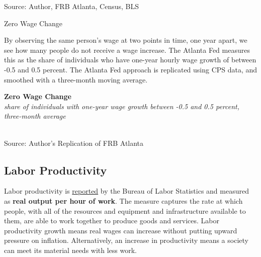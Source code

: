 \documentclass{report}
\makeatletter
\newcommand{\tbllink}[1]{\href{https://raw.githubusercontent.com/bdecon/US-chartbook/master/chartbook/data/#1}{\faTable}}
\newcommand*\short[1]{\expandafter\@gobbletwo\number\numexpr#1\relax}
\newcommand{\dateaxisticks}{
		date coordinates in=x, axis line style={draw=none},
		xmax={2023-11-30},
		max space between ticks=40,	    
		xtick={{1990-01-01}, {1992-01-01}, {1994-01-01}, 
			{1996-01-01}, {1998-01-01}, {2000-01-01}, 
			{2002-01-01}, {2004-01-01}, {2006-01-01},
			{2008-01-01}, {2010-01-01}, {2012-01-01}, {2014-01-01},
		    {2016-01-01}, {2018-01-01}, {2020-01-01}, {2022-01-01}, 
		    {2024-01-01}, {2026-01-01}},
		minor xtick={{1989-01-01}, {1991-01-01}, {1993-01-01},
			{1995-01-01}, {1997-01-01}, {1999-01-01}, 
			{2001-01-01}, {2003-01-01}, {2005-01-01}, {2007-01-01},
		    {2009-01-01}, {2011-01-01}, {2013-01-01}, {2015-01-01},
		    {2017-01-01}, {2019-01-01}, {2021-01-01}, {2023-01-01}, 
		    {2025-01-01}, {2027-01-01}},
		enlarge y limits={0.06}, enlarge x limits={0.01},
		xticklabel style={align=center, yshift=-2pt}, tick label style={inner sep=0pt},
		}
\newcommand{\bbar}[2]{extra #1 ticks = {{#2}}, extra #1 tick labels = ,
		extra #1 tick style = {grid=major, grid style={thick, black!25}},}
\newcommand{\stdline}[4]{\addplot[very thick, no markers, color=#1] 
		table [x=#2, y=#3, col sep=comma] {#4};	}
\newcommand{\rebars}{
		\fill[color=black!10] (axis cs:{2007-12-01},\pgfkeysvalueof{/pgfplots/ymin}) rectangle 
			(axis cs:{2009-07-01}, \pgfkeysvalueof{/pgfplots/ymax});
		\fill[color=black!10] (axis cs:{2001-03-01},\pgfkeysvalueof{/pgfplots/ymin}) rectangle 
			(axis cs:{2001-11-01}, \pgfkeysvalueof{/pgfplots/ymax});
		\fill[color=black!10] (axis cs:{2020-02-01},\pgfkeysvalueof{/pgfplots/ymin}) rectangle 
			(axis cs:{2020-05-01}, \pgfkeysvalueof{/pgfplots/ymax});}
\makeatother
\begin{document}
{\begin{minipage}{0.76\textwidth}
\footnotesize{Source: Author, FRB Atlanta, Census, BLS} \hfill \tbllink{atl_wgt.csv}
\vspace{3mm}

\normalsize Zero Wage Change
\vspace*{-0.5mm}

\small By observing the same person's wage at two points in time, one year apart, we see how many people do not receive a wage increase. The Atlanta Fed measures this as the share of individuals who have one-year hourly wage growth of between -0.5 and 0.5 percent. The Atlanta Fed approach is replicated using CPS data, and smoothed with a three-month moving average. 


\vspace{1mm}

\normalsize \textbf{Zero Wage Change}\\
\footnotesize{\textit{share of individuals with one-year wage growth between -0.5 and 0.5 percent, three-month average}}\\
\hspace*{-1mm} \\
\footnotesize{Source: Author's Replication of FRB Atlanta} \hfill \tbllink{atl_wgt.csv}
\end{minipage}
\newpage
\vspace*{-10mm}

\begin{minipage}{0.76\textwidth}
\subsection*{Labor Productivity}
\hypertarget{labprod}{\label{labprod}}
\small Labor productivity is \href{https://www.bls.gov/news.release/prod2.nr0.htm}{reported} by the Bureau of Labor Statistics and measured as \textbf{real output per hour of work}. The measure captures the rate at which people, with all of the resources and equipment and infrastructure available to them, are able to work together to produce goods and services. Labor productivity growth means real wages can increase without putting upward pressure on inflation. Alternatively, an increase in productivity means a society can meet its material needs with less work.
\end{minipage}

}
\end{document}
